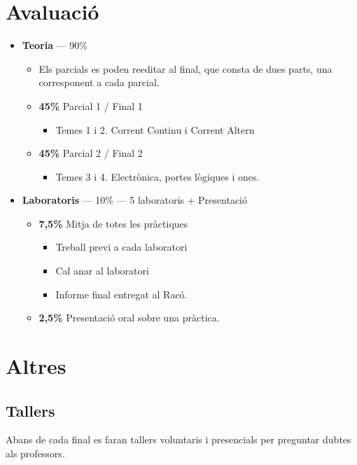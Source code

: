 \documentclass[12pt, a4paper, twoside]{report}
\begin{document}
\section*{Avaluació}
\begin{itemize}
    \item \textbf{Teoria} --- 90\%
    \begin{itemize}
        \item Els parcials es poden reeditar al final, que consta de dues parts, una corresponent a cada parcial. 
            \item \textbf{45\%} Parcial 1 / Final 1
        \begin{itemize}
            \item Temes 1 i 2. Corrent Continu i Corrent Altern
        \end{itemize}
        \item \textbf{45\%} Parcial 2 / Final 2
        \begin{itemize}
            \item Temes 3 i 4. Electrònica, portes lògiques i ones.     
        \end{itemize}
    \end{itemize}
    \item \textbf{Laboratoris}   --- 10\% --- 5 laboratoris + Presentació
    \begin{itemize}
        \item \textbf{7,5\%} Mitja de totes les pràctiques
        \begin{itemize}
            \item Treball previ a cada laboratori
            \item Cal anar al laboratori
            \item Informe final entregat al Racó.
        \end{itemize}
        \item \textbf{2,5\%} Presentació oral sobre una pràctica. 
        
    \end{itemize}
  \end{itemize}

\section*{Altres}
\subsection*{Tallers}
Abans de cada final es faran tallers voluntaris i presencials per preguntar dubtes als professors. 
\end{document}
